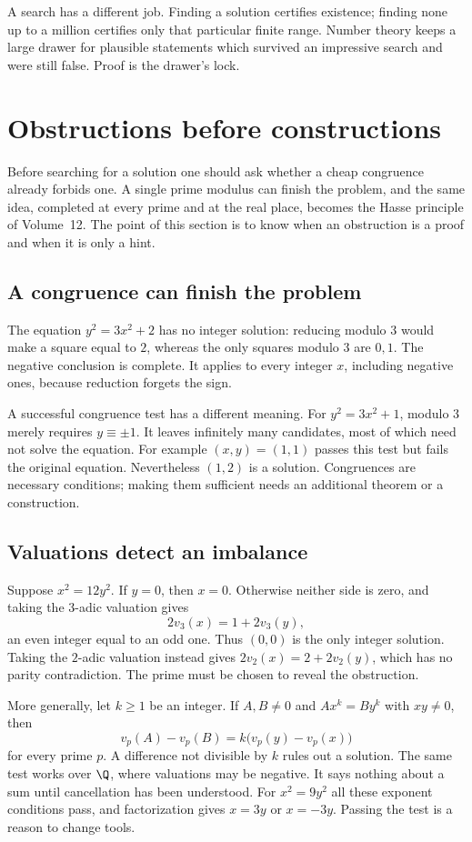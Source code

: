 A search has a different job. Finding a solution certifies existence; finding none up to a million certifies only that particular finite range. Number theory keeps a large drawer for plausible statements which survived an impressive search and were still false. Proof is the drawer's lock.

\section{Obstructions before constructions}

Before searching for a solution one should ask whether a cheap congruence already forbids one. A single prime modulus can finish the problem, and the same idea, completed at every prime and at the real place, becomes the Hasse principle of Volume~12. The point of this section is to know when an obstruction is a proof and when it is only a hint.

\subsection*{A congruence can finish the problem}
The equation $y^2=3x^2+2$ has no integer solution: reducing modulo $3$
would make a square equal to $2$, whereas the only squares modulo $3$ are
$0,1$. The negative conclusion is complete. It applies to every integer
$x$, including negative ones, because reduction forgets the sign.

A successful congruence test has a different meaning. For $y^2=3x^2+1$,
modulo $3$ merely requires $y\equiv\pm1$. It leaves infinitely many
candidates, most of which need not solve the equation. For example $(x,y)=(1,1)$
passes this test but fails the original equation. Nevertheless $(1,2)$ is a
solution. Congruences are necessary conditions; making them sufficient needs
an additional theorem or a construction.

\subsection*{Valuations detect an imbalance}
Suppose $x^2=12y^2$. If $y=0$, then $x=0$. Otherwise neither side is zero,
and taking the $3$-adic valuation gives
\[
2v_3(x)=1+2v_3(y),
\]
an even integer equal to an odd one. Thus $(0,0)$ is the only integer
solution. Taking the $2$-adic valuation instead gives
$2v_2(x)=2+2v_2(y)$, which has no parity contradiction. The prime must be
chosen to reveal the obstruction.

More generally, let $k\ge1$ be an integer. If $A,B\ne0$ and $Ax^k=By^k$ with $xy\ne0$, then
\[
v_p(A)-v_p(B)=k\bigl(v_p(y)-v_p(x)\bigr)
\]
for every prime $p$. A difference not divisible by $k$ rules out a solution.
The same test works over $\Q$, where valuations may be negative.
It says nothing about a sum until cancellation has been understood.
For $x^2=9y^2$ all these exponent conditions pass, and factorization gives
$x=3y$ or $x=-3y$. Passing the test is a reason to change tools.

